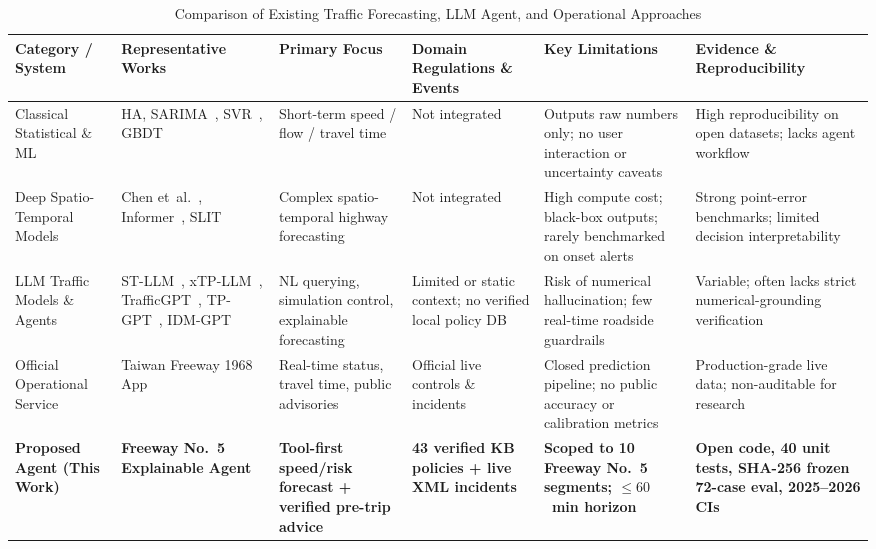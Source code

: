 \documentclass[conference]{IEEEtran}
\begin{document}
\begin{table}[!t]
\caption{Comparison of Existing Traffic Forecasting, LLM Agent, and Operational Approaches}
\label{tab:related_work}
\centering
\footnotesize
\setlength{\tabcolsep}{4.5pt}
\begin{tabular}{p{2.3cm}p{2.4cm}p{2.7cm}p{2.4cm}p{2.8cm}p{3.0cm}}
\toprule
\textbf{Category / System} & \textbf{Representative Works} & \textbf{Primary Focus} & \textbf{Domain Regulations \& Events} & \textbf{Key Limitations} & \textbf{Evidence \& Reproducibility} \\
\midrule
Classical Statistical \& ML & HA, SARIMA~\cite{williams2003sarima}, SVR~\cite{wu2004svr}, GBDT~\cite{ke2017lightgbm} & Short-term speed / flow / travel time & Not integrated & Outputs raw numbers only; no user interaction or uncertainty caveats & High reproducibility on open datasets; lacks agent workflow \\
\addlinespace[3pt]
Deep Spatio-Temporal Models & Chen et~al.~\cite{chen2021etc}, Informer~\cite{zhou2021informer}, SLIT~\cite{lin2024slit} & Complex spatio-temporal highway forecasting & Not integrated & High compute cost; black-box outputs; rarely benchmarked on onset alerts & Strong point-error benchmarks; limited decision interpretability \\
\addlinespace[3pt]
LLM Traffic Models \& Agents & ST-LLM~\cite{liu2024stllm}, xTP-LLM~\cite{guo2024xtpllm}, TrafficGPT~\cite{zhang2023trafficgpt}, TP-GPT~\cite{wang2024tpgpt}, IDM-GPT~\cite{yang2025idmgpt} & NL querying, simulation control, explainable forecasting & Limited or static context; no verified local policy DB & Risk of numerical hallucination; few real-time roadside guardrails & Variable; often lacks strict numerical-grounding verification \\
\addlinespace[3pt]
Official Operational Service & Taiwan Freeway 1968 App & Real-time status, travel time, public advisories & Official live controls \& incidents & Closed prediction pipeline; no public accuracy or calibration metrics & Production-grade live data; non-auditable for research \\
\addlinespace[3pt]
\textbf{Proposed Agent (This Work)} & \textbf{Freeway No.~5 Explainable Agent} & \textbf{Tool-first speed/risk forecast + verified pre-trip advice} & \textbf{43 verified KB policies + live XML incidents} & \textbf{Scoped to 10 Freeway No.~5 segments; $\le 60$~min horizon} & \textbf{Open code, 40 unit tests, SHA-256 frozen 72-case eval, 2025--2026 CIs} \\
\bottomrule
\end{tabular}
\end{table}
\end{document}
